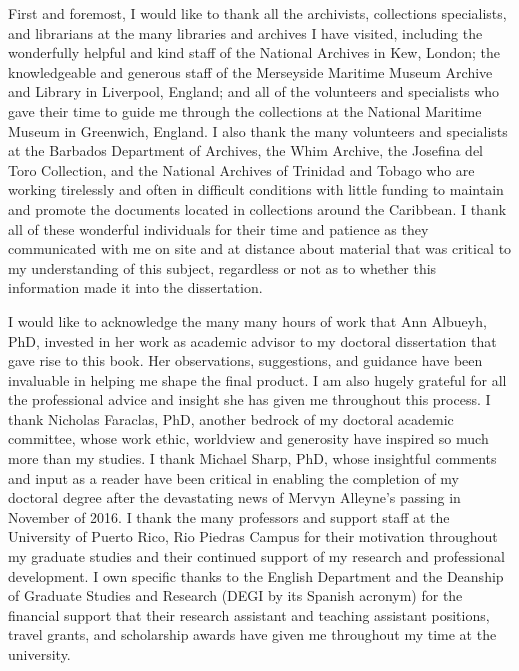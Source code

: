\addchap{\lsAcknowledgementTitle}
First and foremost, I would like to thank all the archivists, collections specialists, and librarians at the many libraries and archives I have visited, including the wonderfully helpful and kind staff of the National Archives in Kew, London; the knowledgeable and generous staff of the Merseyside Maritime Museum Archive and Library in Liverpool, England; and all of the volunteers and specialists who gave their time to guide me through the collections at the National Maritime Museum in Greenwich, England. I also thank the many volunteers and specialists at the Barbados Department of Archives, the Whim Archive, the Josefina del Toro Collection, and the National Archives of Trinidad and Tobago who are working tirelessly and often in difficult conditions with little funding to maintain and promote the documents located in collections around the Caribbean. I thank all of these wonderful individuals for their time and patience as they communicated with me on site and at distance about material that was critical to my understanding of this subject, regardless or not as to whether this information made it into the dissertation. 

I would like to acknowledge the many many hours of work that Ann Albueyh, PhD, invested in her work as academic advisor to my doctoral dissertation that gave rise to this book. Her observations, suggestions, and guidance have been invaluable in helping me shape the final product. I am also hugely grateful for all the professional advice and insight she has given me throughout this process. I thank Nicholas Faraclas, PhD, another bedrock of my doctoral academic committee, whose work ethic, worldview and generosity have inspired so much more than my studies. I thank Michael Sharp, PhD, whose insightful comments and input as a reader have been critical in enabling the completion of my doctoral degree after the devastating news of Mervyn Alleyne’s passing in November of 2016. I thank the many professors and support staff at the University of Puerto Rico, Rio Piedras Campus for their motivation throughout my graduate studies and their continued support of my research and professional development. I own specific thanks to the English Department and the Deanship of Graduate Studies and Research (DEGI by its Spanish acronym) for the financial support that their research assistant and teaching assistant positions, travel grants, and scholarship awards have given me throughout my time at the university.

